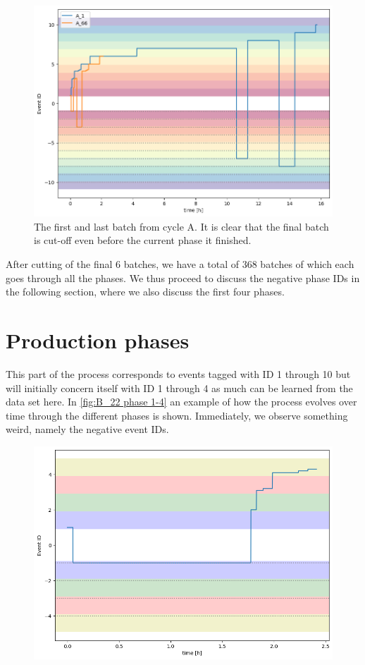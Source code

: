 \documentclass[../Thesis.tex]{subfiles}
\begin{document}
\begin{figure}[h]
    \centering
    \includegraphics[width=0.8\linewidth]{figures/Multiple cycles data/tailing batch short.png}
    \caption{The first and last batch from cycle A. It is clear that the final batch is cut-off even before the current phase it finished.}
    \label{fig:last batch example}
\end{figure}

After cutting of the final 6 batches, we have a total of 368 batches of which each goes through all the phases. We thus proceed to discuss the negative phase IDs in the following section, where we also discuss the first four phases.




\newpage

\section{Production phases}
This part of the process corresponds to events tagged with ID 1 through 10 but will initially concern itself with ID 1 through 4 as much can be learned from the data set here. In \autoref{fig:B_22 phase 1-4} an example of how the process evolves over time through the different phases is shown. Immediately, we observe something weird, namely the negative event IDs.

\begin{figure}[h]
    \centering
    \includegraphics[width=.7\linewidth]{figures/Multiple cycles data/Adding of solids/B_22 long waiting.png}
    \caption{}
    \label{fig:B_22 phase 1-4}
\end{figure}
\end{document}
